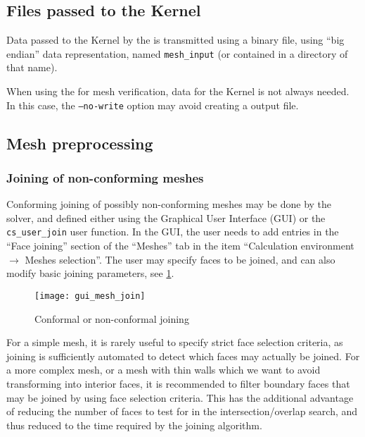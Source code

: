 {{{\subsection{Files passed to the Kernel\label{sec:pcs:mode_comm}}

Data passed to the Kernel by the \pcs is transmitted using a
binary file, using ``big endian'' data representation, named
\texttt{mesh\_input} (or contained in a directory of that name).

When using the \pcs for mesh verification, data for the Kernel
is not always needed. In this case, the \texttt{--no-write} option may
avoid creating a \pcs output file.

\subsection{Mesh preprocessing%
\label{sec:prepro}}

\subsubsection{Joining of non-conforming meshes}\label{sec:optpcs:join}

Conforming joining of possibly non-conforming meshes may be done by the
solver, and defined either using the Graphical User Interface (GUI) or the
\texttt{cs\_user\_join} user function. In the GUI, the user needs to
add entries in the ``Face joining'' section of the ``Meshes'' tab in the item
``Calculation environment $\rightarrow$ Meshes selection''.
The user may specify faces to be joined, and can also modify basic joining
parameters, see \figurename\ref{fig:joining}.
%
\begin{figure}[!h]
\begin{center}
\texttt{[image: gui\_mesh\_join]}
\caption{Conformal or non-conformal joining}
\label{fig:joining}
\end{center}
\end{figure}
%
For a simple mesh, it is rarely useful to specify strict face selection
criteria, as joining is sufficiently automated to detect which faces
may actually be joined. For a more complex mesh, or a mesh with thin
walls which we want to avoid transforming into interior faces, it is
recommended to filter boundary faces that may be joined by using
face selection criteria. This has the
additional advantage of reducing the number of faces to test for
in the intersection/overlap search, and thus reduced to the time
required by the joining algorithm.

}}}

